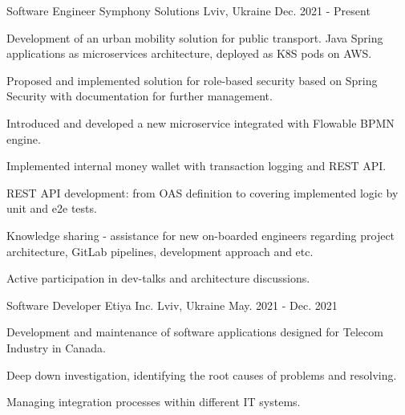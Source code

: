 

\begin{cventries}
  \cventry
    {Software Engineer} %
    {Symphony Solutions} %
    {Lviv, Ukraine} %
    {Dec. 2021 - Present} %
    {
      \begin{cvitems} %
        \item {Development of an urban mobility solution for public transport. Java Spring  applications as microservices architecture, deployed as K8S pods on AWS.}
        \item {Proposed and implemented solution for role-based security based on Spring Security with documentation for further management.}
        \item {Introduced and developed a new microservice integrated with Flowable BPMN engine.}
        \item {Implemented internal money wallet with transaction logging and REST API.}
        \item {REST API development: from OAS definition to covering implemented logic by unit and e2e tests.}
        \item {Knowledge sharing - assistance for new on-boarded engineers regarding project architecture, GitLab pipelines, development approach and etc.}
        \item {Active participation in dev-talks and architecture discussions.}
      \end{cvitems}
    }
  \cventry
    {Software Developer} %
    {Etiya Inc.} %
    {Lviv, Ukraine} %
    {May. 2021 - Dec. 2021} %
    {
      \begin{cvitems} %
        \item {Development and maintenance of software applications designed for Telecom Industry in Canada.}
        \item {Deep down investigation, identifying the root causes of problems and resolving.}
        \item {Managing integration processes within different IT systems.}

\end{cvitems}}
\end{cventries}
